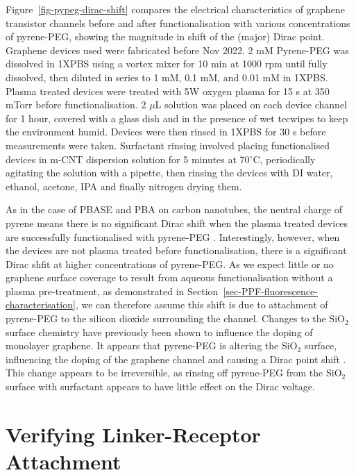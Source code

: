 \documentclass[
  a4paper,
]{scrbook}
\begin{document}
Figure~\ref{fig-pypeg-dirac-shift} compares the electrical
characteristics of graphene transistor channels before and after
functionalisation with various concentrations of pyrene-PEG, showing the
magnitude in shift of the (major) Dirac point. Graphene devices used
were fabricated before Nov 2022. 2 mM Pyrene-PEG was dissolved in 1XPBS
using a vortex mixer for 10 min at 1000 rpm until fully dissolved, then
diluted in series to 1 mM, 0.1 mM, and 0.01 mM in 1XPBS. Plasma treated
devices were treated with 5W oxygen plasma for 15 s at 350 mTorr before
functionalisation. 2 \(\mu\)L solution was placed on each device channel
for 1 hour, covered with a glass dish and in the presence of wet
tecwipes to keep the environment humid. Devices were then rinsed in
1XPBS for 30 s before measurements were taken. Surfactant rinsing
involved placing functionalised devices in m-CNT dispersion solution for
5 minutes at 70\(^\circ\)C, periodically agitating the solution with a
pipette, then rinsing the devices with DI water, ethanol, acetone, IPA
and finally nitrogen drying them.

As in the case of PBASE and PBA on carbon nanotubes, the neutral charge
of pyrene means there is no significant Dirac shift when the plasma
treated devices are successfully functionalised with pyrene-PEG
\autocite{Lerner2012}. Interestingly, however, when the devices are not
plasma treated before functionalisation, there is a significant Dirac
shfit at higher concentrations of pyrene-PEG. As we expect little or no
graphene surface coverage to result from aqueous functionalisation
without a plasma pre-treatment, as demonstrated in
Section~\ref{sec-PPF-fluorescence-characterisation}, we can therefore
assume this shift is due to attachment of pyrene-PEG to the silicon
dioxide surrounding the channel. Changes to the SiO\(_2\) surface
chemistry have previously been shown to influence the doping of
monolayer graphene. It appears that pyrene-PEG is altering the SiO\(_2\)
surface, influencing the doping of the graphene channel and causing a
Dirac point shift \autocite{Shi2009}. This change appears to be
irreversible, as rinsing off pyrene-PEG from the SiO\(_2\) surface with
surfactant appears to have little effect on the Dirac voltage.

\hypertarget{sec-linker-receptor-attachment}{%
\section{Verifying Linker-Receptor
Attachment}\label{sec-linker-receptor-attachment}}
\end{document}
